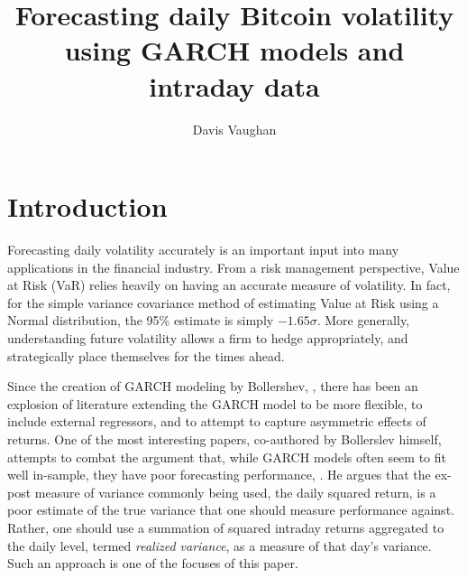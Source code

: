 \documentclass[10pt,twoside,printwatermark=false]{pinp}
\title{Forecasting daily Bitcoin volatility using GARCH models and intraday
data}
\author[University of North Carolina at Charlotte]{Davis Vaughan}
\begin{document}
\verticaladjustment{-2pt}

\maketitle
\thispagestyle{firststyle}



\section{Introduction}\label{introduction}

Forecasting daily volatility accurately is an important input into many
applications in the financial industry. From a risk management
perspective, Value at Risk (VaR) relies heavily on having an accurate
measure of volatility. In fact, for the simple variance covariance
method of estimating Value at Risk using a Normal distribution, the 95\%
estimate is simply \(-1.65 \sigma\). More generally, understanding
future volatility allows a firm to hedge appropriately, and
strategically place themselves for the times ahead.

Since the creation of GARCH modeling by Bollershev, \cite{Garch}, there
has been an explosion of literature extending the GARCH model to be more
flexible, to include external regressors, and to attempt to capture
asymmetric effects of returns. One of the most interesting papers,
co-authored by Bollerslev himself, attempts to combat the argument that,
while GARCH models often seem to fit well in-sample, they have poor
forecasting performance, \cite{AndersonBollerslev}. He argues that the
ex-post measure of variance commonly being used, the daily squared
return, is a poor estimate of the true variance that one should measure
performance against. Rather, one should use a summation of squared
intraday returns aggregated to the daily level, termed \emph{realized
variance}, as a measure of that day's variance. Such an approach is one
of the focuses of this paper.
\end{document}
